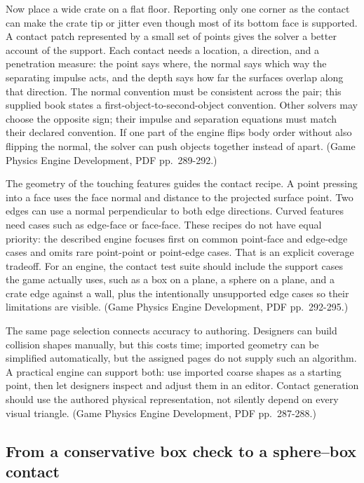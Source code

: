 Now place a wide crate on a flat floor. Reporting only one corner as the contact can make the crate tip or jitter even though most of its bottom face is supported. A contact patch represented by a small set of points gives the solver a better account of the support. Each contact needs a location, a direction, and a penetration measure: the point says where, the normal says which way the separating impulse acts, and the depth says how far the surfaces overlap along that direction. The normal convention must be consistent across the pair; this supplied book states a first-object-to-second-object convention. Other solvers may choose the opposite sign; their impulse and separation equations must match their declared convention. If one part of the engine flips body order without also flipping the normal, the solver can push objects together instead of apart. (Game Physics Engine Development, PDF pp.~289-292.)

The geometry of the touching features guides the contact recipe. A point pressing into a face uses the face normal and distance to the projected surface point. Two edges can use a normal perpendicular to both edge directions. Curved features need cases such as edge-face or face-face. These recipes do not have equal priority: the described engine focuses first on common point-face and edge-edge cases and omits rare point-point or point-edge cases. That is an explicit coverage tradeoff. For an engine, the contact test suite should include the support cases the game actually uses, such as a box on a plane, a sphere on a plane, and a crate edge against a wall, plus the intentionally unsupported edge cases so their limitations are visible. (Game Physics Engine Development, PDF pp.~292-295.)

The same page selection connects accuracy to authoring. Designers can build collision shapes manually, but this costs time; imported geometry can be simplified automatically, but the assigned pages do not supply such an algorithm. A practical engine can support both: use imported coarse shapes as a starting point, then let designers inspect and adjust them in an editor. Contact generation should use the authored physical representation, not silently depend on every visual triangle. (Game Physics Engine Development, PDF pp.~287-288.)

\subsection{From a conservative box check to a sphere--box contact}\label{06-engine-ii-ch033-from-a-conservative-box-check-to-a-spherebox-contact}


